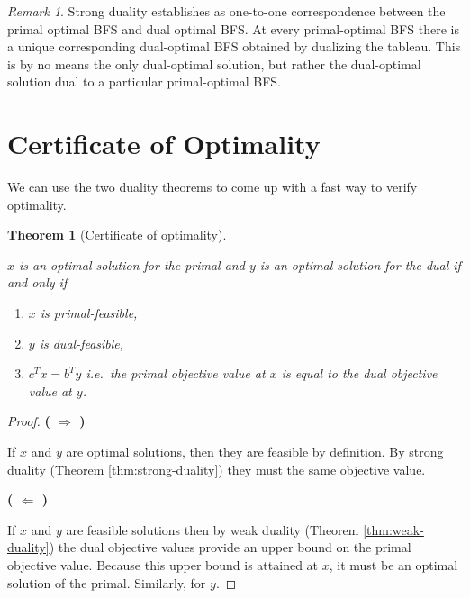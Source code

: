 \documentclass[
]{book}
\providecommand{\tightlist}{%
  \setlength{\itemsep}{0pt}\setlength{\parskip}{0pt}}
\newtheorem{theorem}{Theorem}[chapter]
\theoremstyle{definition}
\theoremstyle{definition}
\theoremstyle{definition}
\theoremstyle{definition}
\theoremstyle{remark}
\newtheorem*{remark}{Remark}
\begin{document}
\begin{remark}
Strong duality establishes as one-to-one correspondence between the primal optimal BFS and dual
optimal BFS. At every primal-optimal BFS there is a unique corresponding dual-optimal BFS obtained
by dualizing the tableau. This is by no means the only dual-optimal solution, but rather the
dual-optimal solution dual to a particular primal-optimal BFS.
\end{remark}

\hypertarget{certificate-of-optimality}{%
\section{Certificate of Optimality}\label{certificate-of-optimality}}

We can use the two duality theorems to come up with a fast way to verify optimality.

\begin{theorem}[Certificate of optimality]
\protect\hypertarget{thm:certificate-of-optimality}{}\label{thm:certificate-of-optimality}

\(x\) is an optimal solution for the primal and \(y\) is an optimal solution for the dual if and
only if

\begin{enumerate}
\def\labelenumi{\arabic{enumi}.}
\tightlist
\item
  \(x\) is primal-feasible,
\item
  \(y\) is dual-feasible,
\item
  \(c^T x = b^T y\) i.e.~the primal objective value at \(x\) is equal to the dual objective value
  at \(y\).
\end{enumerate}

\end{theorem}

\begin{proof}
\textbf{( \(\Rightarrow\) )}

If \(x\) and \(y\) are optimal solutions, then they are feasible by definition. By strong duality
(Theorem \ref{thm:strong-duality}) they must the same objective value.

\textbf{( \(\Leftarrow\) )}

If \(x\) and \(y\) are feasible solutions then by weak duality (Theorem \ref{thm:weak-duality}) the
dual objective values provide an upper bound on the primal objective value. Because this upper bound
is attained at \(x\), it must be an optimal solution of the primal. Similarly, for \(y\).
\end{proof}
\end{document}
